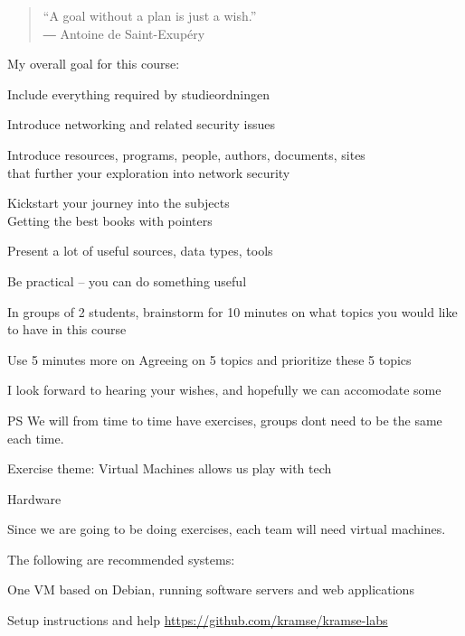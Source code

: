 \documentclass[Screen16to9,17pt]{foils}
\begin{document}


\begin{quote}
  “A goal without a plan is just a wish.”\\
  ― Antoine de Saint-Exupéry
\end{quote}

My overall goal for this course:
\begin{list2}
\item Include everything required by studieordningen
\item Introduce networking and related security issues
\item Introduce resources, programs, people, authors, documents, sites\\
 that further your exploration into network security
\item Kickstart your journey into the subjects\\
Getting the best books with pointers
\item Present a lot of useful sources, data types, tools
\item Be practical -- you can do something useful
\end{list2}





In groups of 2 students, brainstorm for 10 minutes on what topics you would like to have in this course

Use 5 minutes more on Agreeing on 5 topics and prioritize these 5 topics

I look forward to hearing your wishes, and hopefully we can accomodate some

\vskip 1cm
PS We will from time to time have exercises, groups dont need to be the same each time.




Exercise theme: Virtual Machines allows us play with tech

Hardware

Since we are going to be doing exercises, each team will need virtual machines.

The following are recommended systems:
\begin{list2}
\item One VM based on Debian, running software servers and web applications
\item Setup instructions and help \url{https://github.com/kramse/kramse-labs}
\end{list2}
\end{document}
